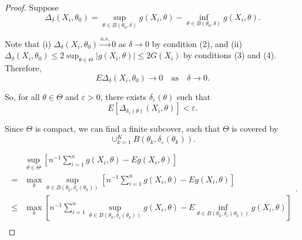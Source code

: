 \begin{proof}
	Suppose
	\begin{equation*}
		\Delta_{\delta}\left(X_{i},\theta_{0}\right)=\sup_{\theta\in B\left(\theta_{0},\delta\right)}g\left(X_{i},\theta\right)-\inf_{\theta\in B\left(\theta_{0},\delta\right)}g\left(X_{i},\theta\right).
	\end{equation*}

	Note that (i) \(\Delta_{\delta}\left(X_{i},\theta_{0}\right)\stackrel{a.s.}{\rightarrow} 0\) as \(\delta\to 0\) by condition (2), and (ii) \(\Delta_{\delta}\left(X_{i},\theta_{0}\right) \leq 2\sup_{\theta\in\Theta}\left|g\left(X_{i},\theta\right)\right|\leq 2G\left(X_{i}\right)\) by conditions (3) and (4). Therefore,
	\begin{equation*}
		E\Delta_{\delta}\left(X_{i},\theta_{0}\right)\rightarrow 0 \quad \text{as} \quad \delta\rightarrow 0.
	\end{equation*}

	So, for all \(\theta\in\Theta\) and \(\varepsilon>0\), there exists \(\delta_{\varepsilon}(\theta)\) such that
	\begin{equation*}
		E\left[\Delta_{\delta_{\varepsilon}(\theta)}\left(X_{i},\theta\right)\right]<\varepsilon.
	\end{equation*}

	Since \(\Theta\) is compact, we can find a finite subcover, such that \(\Theta\) is covered by
	\begin{equation*}
		\cup_{k=1}^{K}B\left(\theta_{k}, \delta_{\varepsilon}\left(\theta_{k}\right)\right).
	\end{equation*}

	\begin{equation*}
		\begin{aligned}
			     & \sup_{\theta\in\Theta}\left[n^{-1}\sum_{i=1}^{n}g\left(X_{i},\theta\right)-Eg\left(X_{i},\theta\right)\right]                                                                                                                                                             \\
			=    & \max_{k}\sup_{\theta\in B\left(\theta_{k},\delta_{\varepsilon}\left(\theta_{k}\right)\right)}\left[n^{-1}\sum_{i=1}^{n}g\left(X_{i},\theta\right)-Eg\left(X_{i},\theta\right)\right]                                                                                      \\
			\leq & \max_{k}\left[n^{-1}\sum_{i=1}^{n}\sup_{\theta\in B\left(\theta_{k},\delta_{\varepsilon}\left(\theta_{k}\right)\right)}g\left(X_{i},\theta\right)-E\inf_{\theta\in B\left(\theta_{k},\delta_{\varepsilon}\left(\theta_{k}\right)\right)}g\left(X_{i},\theta\right)\right] \\
		\end{aligned}.
	\end{equation*}


\end{proof}
